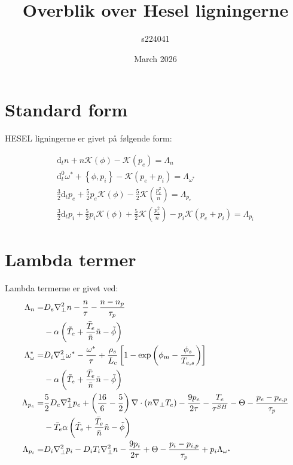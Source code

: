 \documentclass{article}
\title{Overblik over Hesel ligningerne}
\author{s224041}
\date{March 2026}
\begin{document}
\maketitle
\newpage

\section{Standard form}

HESEL ligningerne er givet på følgende form:

\begin{gather}
    \mathrm{d} _t n + n\mathcal{K}(\phi) - \mathcal{K}(p_e) = \Lambda_n  \label{EQ_n} \\ 
    \mathrm{d}_t^0 \omega^* + \left\{\phi, p_i \right\} - \mathcal{K}(p_e+p_i)=\Lambda_{\omega^*} \label{EQ_w} \\
    \frac{3}{2}\mathrm{d} _t p_e + \frac{5}{2}p_e \mathcal{K}(\phi) -\frac{5}{2}\mathcal{K}\left(\frac{p_e^2}{n}\right)= \Lambda_{p_e}\label{EQ_p_e} \\
    \frac{3}{2}\mathrm{d} _t p_i + \frac{5}{2}p_i \mathcal{K}(\phi) +\frac{5}{2}\mathcal{K}\left(\frac{p_i^2}{n}\right) - p_i\mathcal{K}(p_e+p_i) = \Lambda_{p_i} \label{EQ_p_i}
\end{gather}


\section{Lambda termer}
Lambda termerne er givet ved:
\begin{align}
\Lambda_n =& D_e\nabla_\perp^2 n -\frac{n}{\tau} -\frac{n-n_p}{\tau_p} \notag\\ 
            &-\alpha\left(\tilde T_e+ \frac{\bar T_e}{\bar n}\tilde n-\tilde\phi\right) \label{L_n}\\ 
\Lambda_\omega^{*}=& D_i\nabla_\perp^2\omega^{*}-\frac{\omega^{*}}{\tau}+\frac{\rho_s}{L_c}\left[1-\exp\left(\phi_m-\frac{\phi_s}{T_{e,s}}\right)\right] \notag\\
            &-\alpha\left( \tilde T_e+ \frac{\bar T_e}{\bar n}\tilde n -\tilde\phi \right) \label{L_w}\\
\Lambda_{p_e} =& \frac{5}{2}D_e\nabla_\perp^2 p_e  + \left(\frac{16}{6} - \frac{5}{2}\right)\nabla\cdot\left(n\nabla_\perp T_e\right) - \frac{9p_e}{2\tau} - \frac{T_e}{\tau^{SH}}-\Theta -\frac{p_e-p_{e,p}}{\tau_p} \notag\\
            &-\bar T_e \alpha\left( \tilde T_e + \frac{\bar T_e}{\bar n}\tilde n -\tilde\phi \right)\label{L_p_e}\\
\Lambda_{p_i} =& D_i\nabla_\perp^2 p_i - D_iT_i\nabla_\perp^2n - \frac{9p_i}{2\tau} +\Theta -\frac{p_i-p_{i,p}}{\tau_p} +p_i\Lambda_{\omega^*} \label{L_p_i}
\end{align}
\end{document}
